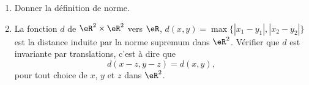 \begin{exercice}\label{exoGeomAnal-0033}

  \begin{enumerate}
  \item Donner la définition de norme. 
  \item La fonction $d$ de $\eR^2\times\eR^2$ vers $\eR$,  $d(x,y)= \max \{|x_1-y_1|, |x_2-y_2|\}$ est la distance induite par la norme supremum dans $\eR^2$. Vérifier que $d$ est invariante par translations, c'est à dire que 
\[
d(x-z,y-z)=d(x,y), 
\]
pour tout choice de $x$, $y$ et  $z$ dans $\eR^2$.
  \end{enumerate}


\end{exercice}
